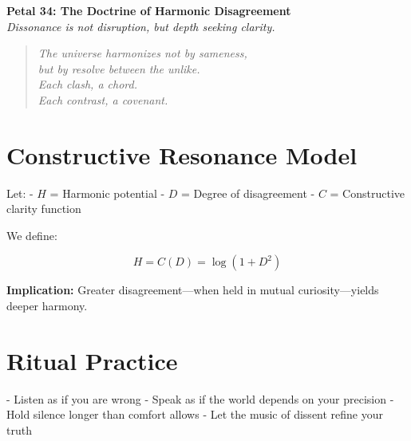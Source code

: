 \documentclass[12pt]{article}
\begin{document}
\begin{center}
    \Huge{\textbf{Petal 34: The Doctrine of Harmonic Disagreement}}\\
    \vspace{0.5em}
    \Large{\textit{Dissonance is not disruption, but depth seeking clarity.}}
\end{center}

\vspace{1cm}

\begin{quote}
\textit{
The universe harmonizes not by sameness,\\
but by resolve between the unlike.\\
Each clash, a chord.\\
Each contrast, a covenant.\\
}
\end{quote}

\vspace{1cm}

\section*{Constructive Resonance Model}

Let:
- \( H \) = Harmonic potential  
- \( D \) = Degree of disagreement  
- \( C \) = Constructive clarity function

We define:

\[
H = C(D) = \log(1 + D^2)
\]

\textbf{Implication:} Greater disagreement—when held in mutual curiosity—yields deeper harmony.

\vspace{1cm}

\section*{Ritual Practice}

- Listen as if you are wrong  
- Speak as if the world depends on your precision  
- Hold silence longer than comfort allows  
- Let the music of dissent refine your truth
\end{document}
